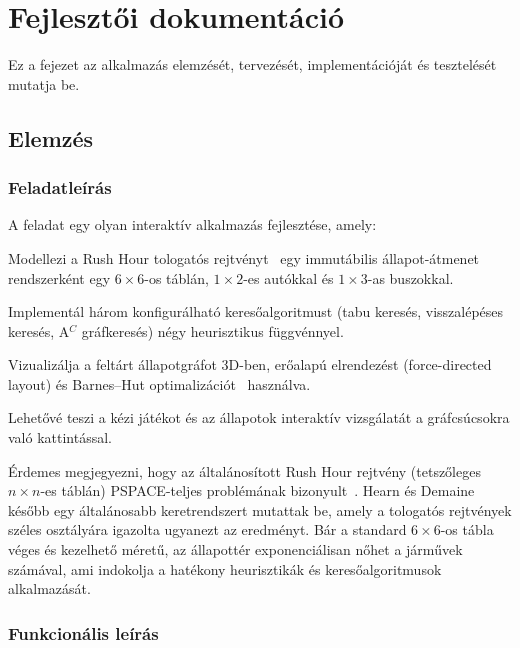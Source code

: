 \chapter{Fejlesztői dokumentáció}
\label{ch:impl}

Ez a fejezet az alkalmazás elemzését, tervezését, implementációját és tesztelését mutatja be.

\section{Elemzés}

\subsection{Feladatleírás}

A feladat egy olyan interaktív alkalmazás fejlesztése, amely:
\begin{compactenum}
\item Modellezi a Rush Hour tologatós rejtvényt~\cite{rushhour_puzzle} egy immutábilis állapot-átmenet rendszerként egy $6\times6$-os táblán, $1\times2$-es autókkal és $1\times3$-as buszokkal.
\item Implementál három konfigurálható keresőalgoritmust (tabu keresés, visszalépéses keresés, A$^C$ gráfkeresés) négy heurisztikus függvénnyel.
\item Vizualizálja a feltárt állapotgráfot 3D-ben, erőalapú elrendezést (force-directed layout) és Barnes–Hut optimalizációt~\cite{barneshut1986} használva.
\item Lehetővé teszi a kézi játékot és az állapotok interaktív vizsgálatát a gráfcsúcsokra való kattintással.
\end{compactenum}

Érdemes megjegyezni, hogy az általánosított Rush Hour rejtvény (tetszőleges $n \times n$-es táblán) PSPACE-teljes problémának bizonyult~\cite{flake2002rush}. Hearn és Demaine~\cite{hearn2005pspace} később egy általánosabb keretrendszert mutattak be, amely a tologatós rejtvények széles osztályára igazolta ugyanezt az eredményt. Bár a standard $6 \times 6$-os tábla véges és kezelhető méretű, az állapottér exponenciálisan nőhet a járművek számával, ami indokolja a hatékony heurisztikák és keresőalgoritmusok alkalmazását.

\subsection{Funkcionális leírás}

